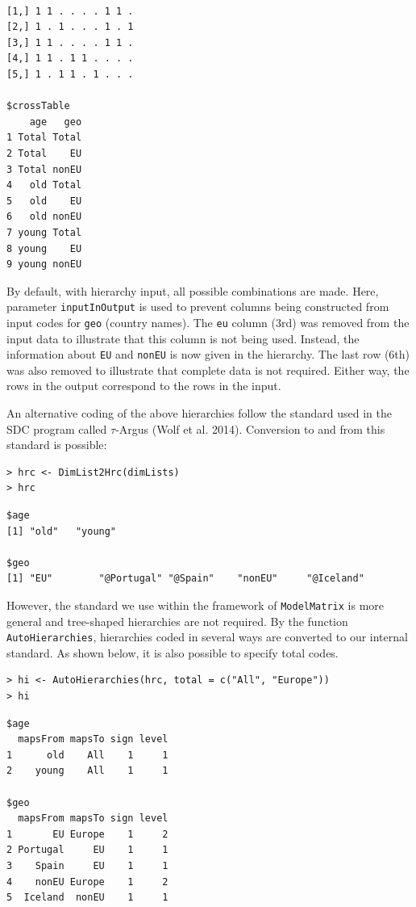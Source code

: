 \begin{verbatim}
                      
[1,] 1 1 . . . . 1 1 .
[2,] 1 . 1 . . . 1 . 1
[3,] 1 1 . . . . 1 1 .
[4,] 1 1 . 1 1 . . . .
[5,] 1 . 1 1 . 1 . . .

$crossTable
    age   geo
1 Total Total
2 Total    EU
3 Total nonEU
4   old Total
5   old    EU
6   old nonEU
7 young Total
8 young    EU
9 young nonEU
\end{verbatim}

By default, with hierarchy input, all possible combinations are made.
Here, parameter \texttt{inputInOutput} is used to prevent columns being constructed from input codes for \texttt{geo} (country names).
The \texttt{eu} column (3rd) was removed from the input data to illustrate that this column is not being used.
Instead, the information about \texttt{EU} and \texttt{nonEU} is now given in the hierarchy.
The last row (6th) was also removed to illustrate that complete data is not required.
Either way, the rows in the output correspond to the rows in the input.

An alternative coding of the above hierarchies follow the standard used in the SDC program called \(\tau\)-Argus (Wolf et al. 2014). Conversion to and from this standard is possible:

\begin{verbatim}
> hrc <- DimList2Hrc(dimLists)
> hrc
\end{verbatim}

\begin{verbatim}
$age
[1] "old"   "young"

$geo
[1] "EU"        "@Portugal" "@Spain"    "nonEU"     "@Iceland" 
\end{verbatim}

However, the standard we use within the framework of \texttt{ModelMatrix} is more general and tree-shaped hierarchies are not required.
By the function \texttt{AutoHierarchies}, hierarchies coded in several ways are converted to our internal standard.
As shown below, it is also possible to specify total codes.

\begin{verbatim}
> hi <- AutoHierarchies(hrc, total = c("All", "Europe"))
> hi
\end{verbatim}

\begin{verbatim}
$age
  mapsFrom mapsTo sign level
1      old    All    1     1
2    young    All    1     1

$geo
  mapsFrom mapsTo sign level
1       EU Europe    1     2
2 Portugal     EU    1     1
3    Spain     EU    1     1
4    nonEU Europe    1     2
5  Iceland  nonEU    1     1
\end{verbatim}

